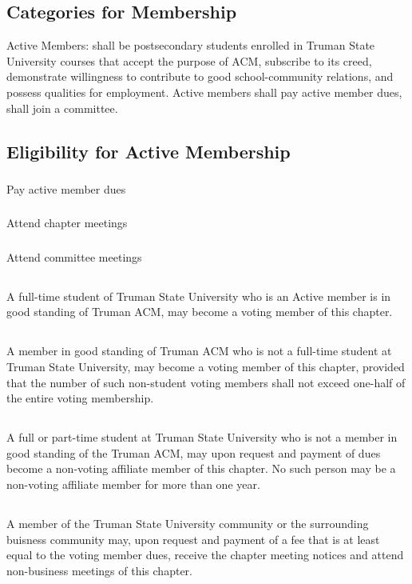 \documentclass[12pt]{article}
\begin{document}
\subsection{Categories for Membership}
	Active Members: shall be postsecondary students enrolled in Truman State University courses that accept the purpose of ACM, subscribe to its creed, demonstrate willingness to contribute to good school-community relations, and possess qualities for employment. Active members shall pay active member dues, shall join a committee.
\subsection{Eligibility for Active Membership}
\subsubsection{}	Pay active member dues
\subsubsection{}	Attend chapter meetings
\subsubsection{}	Attend committee meetings
\subsection{}	A full-time student of Truman State University who is an Active member is in good standing of Truman ACM, may become a voting member of this chapter.
\subsection{}	A member in good standing of Truman ACM who is not a full-time student at Truman State University, may become a voting member of this chapter, provided that the number of such non-student voting members shall not exceed one-half of the entire voting membership.
\subsection{}	A full or part-time student at Truman State University who is not a member in good standing of the Truman ACM, may upon request and payment of dues become a non-voting affiliate member of this chapter. No such person may be a non-voting affiliate member for more than one year.
\subsection{}	A member of the Truman State University community or the surrounding buisness community may, upon request and payment of a fee that is at least equal to the voting member dues, receive the chapter meeting notices and attend non-business meetings of this chapter.
\end{document}
